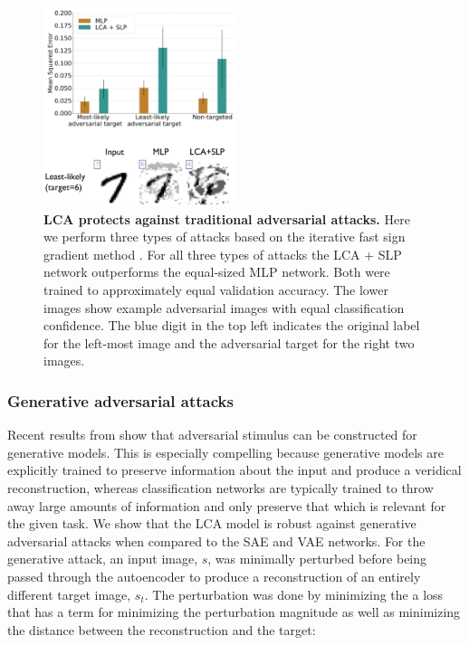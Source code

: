\begin{figure}
    \centering
    \includegraphics[width=0.5\textwidth]{figures/adversarial_mlp_lca_slp.png}
    \caption{\textbf{LCA protects against traditional adversarial attacks.} Here we perform three types of attacks based on the iterative fast sign gradient method \parencite{kurakin2016adversarial}. For all three types of attacks the LCA + SLP network outperforms the equal-sized MLP network. Both were trained to approximately equal validation accuracy. The lower images show example adversarial images with equal classification confidence. The blue digit in the top left indicates the original label for the left-most image and the adversarial target for the right two images.}
    \label{fig:ch4_adversarial_mlp_vs_lca}
\end{figure}


\subsubsection{Generative adversarial attacks}
Recent results from \parencite{kos2018adversarial, gondim2018adversarial} show that adversarial stimulus can be constructed for generative models. This is especially compelling because generative models are explicitly trained to preserve information about the input and produce a veridical reconstruction, whereas classification networks are typically trained to throw away large amounts of information and only preserve that which is relevant for the given task. We show that the LCA model is robust against generative adversarial attacks when compared to the SAE \parencite{ng2011sparse} and VAE \parencite{kingma2013auto} networks. For the generative attack, an input image, $s$, was minimally perturbed before being passed through the autoencoder to produce a reconstruction of an entirely different target image, $s_{t}$. The perturbation was done by minimizing the a loss that has a term for minimizing the perturbation magnitude as well as minimizing the distance between the reconstruction and the target:

